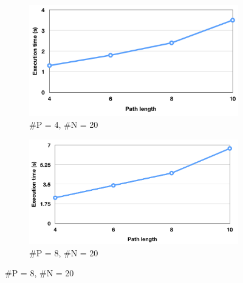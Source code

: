 \begin{figure}[ht]
  \centering

  \begin{subfigure}[b]{0.47\textwidth}
      \includegraphics[width=\textwidth]{figures/global-eval-420-png.png}
      \caption{\#P = 4, \#N = 20}
      \label{fig:eval-gb:a}
  \end{subfigure}
  \begin{subfigure}[b]{0.47\textwidth}
      \includegraphics[width=\textwidth]{figures/global-eval-820-png.png}
      \caption{\#P = 8, \#N = 20}
      \label{fig:eval-gb:b}
  \end{subfigure}


\end{figure}
